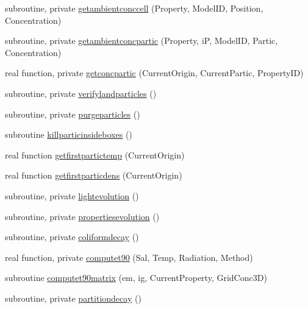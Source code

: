 \begin{DoxyCompactItemize}
\item 
subroutine, private \mbox{\hyperlink{namespacemodulelagrangianglobal_a21c98c8cc24ebb92a5b8821af08be797}{getambientconccell}} (Property, Model\+ID, Position, Concentration)
\item 
subroutine, private \mbox{\hyperlink{namespacemodulelagrangianglobal_a48f3a78b845b645d04afad9baa94ac01}{getambientconcpartic}} (Property, iP, Model\+ID, Partic, Concentration)
\item 
real function, private \mbox{\hyperlink{namespacemodulelagrangianglobal_a7f334bcd9f4c9e4556c095e5e4ff02b4}{getconcpartic}} (Current\+Origin, Current\+Partic, Property\+ID)
\item 
subroutine, private \mbox{\hyperlink{namespacemodulelagrangianglobal_ac120fed4d0c01e0966e67e65fb6d05fc}{verifylandparticles}} ()
\item 
subroutine, private \mbox{\hyperlink{namespacemodulelagrangianglobal_abe2068918e9b300501fc826856caeafa}{purgeparticles}} ()
\item 
subroutine \mbox{\hyperlink{namespacemodulelagrangianglobal_a8d6c65d3eba55f99706d464f633f31b3}{killparticinsideboxes}} ()
\item 
real function \mbox{\hyperlink{namespacemodulelagrangianglobal_a19c897c8ad7d0daf71fbab9514077b55}{getfirstpartictemp}} (Current\+Origin)
\item 
real function \mbox{\hyperlink{namespacemodulelagrangianglobal_a419bd4bef813f469c2fc04f9e386890e}{getfirstparticdens}} (Current\+Origin)
\item 
subroutine, private \mbox{\hyperlink{namespacemodulelagrangianglobal_a4cefc1989887113dc6c716f228c4772f}{lightevolution}} ()
\item 
subroutine, private \mbox{\hyperlink{namespacemodulelagrangianglobal_ad41aee81fdf2c272327a709b9f90d33b}{propertiesevolution}} ()
\item 
subroutine, private \mbox{\hyperlink{namespacemodulelagrangianglobal_a1f9b10a52dd3091e18232addf8002dac}{coliformdecay}} ()
\item 
real function, private \mbox{\hyperlink{namespacemodulelagrangianglobal_a963d16d76b64077295c077df5dcf9e8d}{computet90}} (Sal, Temp, Radiation, Method)
\item 
subroutine \mbox{\hyperlink{namespacemodulelagrangianglobal_aa1fa562342fd711319936084593cafbf}{computet90matrix}} (em, ig, Current\+Property, Grid\+Conc3D)
\item 
subroutine, private \mbox{\hyperlink{namespacemodulelagrangianglobal_acb7dabdfc279e06f8231d68f34a4bd76}{partitiondecay}} ()

\end{DoxyCompactItemize}
